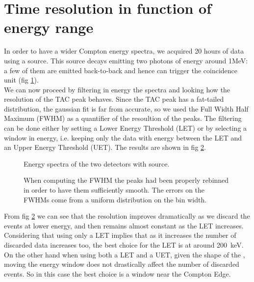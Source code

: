 \documentclass[11pt,a4 paper]{article}
\begin{document}
\section{Time resolution in function of energy range}
In order to have a wider Compton energy spectra, we acquired 20 hours of data using a  source. This source decays emitting two photons of energy around 1\si{\mega\electronvolt}: a few of them are emitted back-to-back and hence can trigger the coincidence unit (fig \ref{fig:Co:spectra}).\\
We can now proceed by filtering in energy the spectra and looking how the resolution of the TAC peak behaves. Since the TAC peak has a fat-tailed distribution, the gaussian fit is far from accurate, so we used the Full Width Half Maximum (FWHM) as a quantifier of the resoultion of the peaks.
The filtering can be done either by setting a Lower Energy Threshold (LET) or by selecting a window in energy, i.e. keeping only the data with energy between the LET and an Upper Energy Threshold (UET). The results are shown in fig \ref{fig:Co:results}.

\begin{figure}[H]
    \centering
    \caption{Energy spectra of the two detectors with  source.}
    \label{fig:Co:spectra}
\end{figure}

\begin{figure}[H]
    \centering
    \caption{When computing the FWHM the peaks had been properly rebinned in order to have them sufficiently smooth. The errors on the FWHMs come from a uniform distribution on the bin width.}
    \label{fig:Co:results}
\end{figure}

From fig \ref{fig:Co:results} we can see that the resolution improves dramatically as we discard the events at lower energy, and then remains almost constant as the LET increases. Considering that using only a LET implies that as it increases the number of discarded data increases too, the best choice for the LET is at around \SI{200}{\kilo\electronvolt}. On the other hand when using both a LET and a UET, given the shape of the , moving the energy window does not drastically affect the number of discarded events. So in this case the best choice is a window near the Compton Edge.

\end{document}
